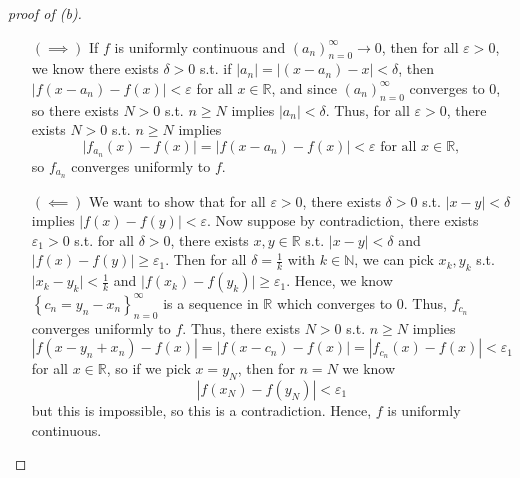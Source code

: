 \begin{proof}[proof of (b)]
  \vphantom{text}
  \begin{itemize}
    \item [\((\implies )\)] If \(f\) is uniformly continuous and \(\left( a_n \right)_{n=0}^{\infty} \to 0 \), then for all \(\varepsilon > 0\), we know there exists \(\delta > 0\) s.t. if \(\vert a_n \vert = \vert (x - a_n) - x \vert < \delta  \), then \(\vert f(x - a_n) - f(x) \vert < \varepsilon  \) for all \(x \in \mathbb{R} \), and since \(\left( a_n \right)_{n=0}^{\infty}  \) converges to \(0\), so there exists \(N > 0\) s.t. \(n \ge N\) implies \(\vert a_n \vert < \delta  \). Thus, for all \(\varepsilon > 0\), there exists \(N > 0\) s.t. \(n 
    \ge N\) implies 
    \[
      \vert f_{a_n}(x) - f(x) \vert = \vert f(x - a_n) - f(x) \vert < \varepsilon \text{ for all } x \in \mathbb{R}, 
    \] so \(f_{a_n}\) converges uniformly to \(f\).                 
    \item [\((\impliedby )\)] We want to show that for all \(\varepsilon > 0\), there exists \(\delta > 0\) s.t. \(\vert x - y \vert < \delta \) implies \(\vert f(x) - f(y) \vert < \varepsilon \). Now suppose by contradiction, there exists \(\varepsilon _1 > 0\) s.t. for all \(\delta > 0\), there exists \(x, y \in \mathbb{R} \) s.t. \(\vert x - y \vert < \delta  \) and \(\vert f(x) - f(y) \vert \ge \varepsilon _1\). Then for all \(\delta = \frac{1}{k}\) with \(k \in \mathbb{N} \), we can pick \(x_k, y_k\) s.t. \(\vert x_k - y_k \vert < \frac{1}{k}\) and \(\vert f(x_k) - f(y_k) \vert \ge \varepsilon _1 \). Hence, we know \(\left\{ c_n = y_n - x_n \right\}_{n=0}^{\infty}  \) is a sequence in \(\mathbb{R} \) which converges to \(0\). Thus, \(f_{c_n}\) converges uniformly to \(f\). Thus, there exists \(N > 0\) s.t. \(n \ge N\) implies 
    \[
      \left\vert f(x - y_n + x_n) - f(x) \right\vert  = \left\vert f(x - c_n) - f(x) \right\vert  = \left\vert f_{c_n}(x) - f(x) \right\vert < \varepsilon_1  
    \] for all \(x \in \mathbb{R} \), so if we pick \(x = y_N\), then for \(n = N\) we know 
    \[
      \left\vert f(x_N) - f(y_N) \right\vert < \varepsilon_1
    \] but this is impossible, so this is a contradiction. Hence, \(f\) is uniformly continuous. 
  \end{itemize}
\end{proof}
